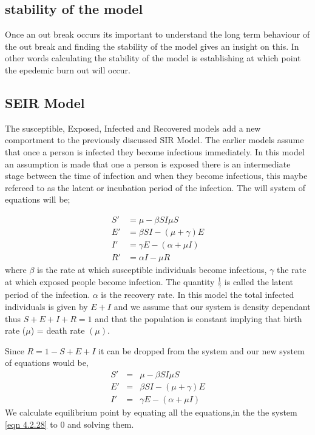   \subsection{stability of the model}
 Once an out break occurs its important to understand the long term behaviour of the out break and finding the stability of the model gives an insight on this. In other words calculating the stability of the model is establishing at which point the epedemic burn out will occur.
 \subsection{SEIR Model}
The susceptible, Exposed, Infected and Recovered models add a new comportment to the previously discussed SIR Model. The earlier models assume that once a person is infected they become infectious immediately. In this model an assumption is made that one a person is exposed there is an intermediate stage between the time of infection and when they become infectious, this maybe refereed  to as the latent  or incubation period of the infection.  The will system of equations will be;

\begin{align}
S'& = \mu -\beta S I  \mu S \\
E' &= \beta S I - (\mu + \gamma) E  \\
I' &= \gamma E - (\alpha + \mu I) \\
R' &= \alpha I  - \mu R 
\end{align}
where $\beta$ is the rate at which susceptible individuals become infectious, $\gamma$ the rate at which exposed people become infection. The quantity $\frac{1}{\gamma}$ is called the latent period of the  infection. $\alpha$ is the recovery rate.
In this model the total infected individuals is given by $E +I$ and  we assume that our system is density dependant thus $S + E + I + R = 1$ and  that the population is constant implying that birth rate ($\mu$)  = death rate $(\mu)$.
 
Since $R = 1- S + E + I$
it can be dropped from the system and our new system of equations would be, 
\begin{equation} \label{eqn 4.2.28}
\begin{array}{ccc}
S'&=& \mu -\beta S I  \mu S \\
E' &=& \beta S I - (\mu + \gamma) E  \\
I' &=& \gamma E - (\alpha + \mu I)
\end{array}
\end{equation}
We calculate equilibrium point by equating all the equations,in the the system  \ref{eqn 4.2.28} to 0 and solving them. 

